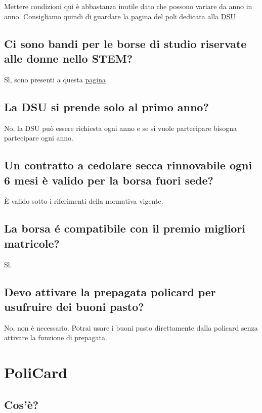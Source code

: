\documentclass[legal]{polinetwork}
\begin{document}
Mettere condizioni qui è abbastanza inutile dato che possono variare da anno in anno. Consigliamo quindi di guardare la pagina del poli dedicata alla \href{https://www.polimi.it/studenti/tasse-borse-e-agevolazioni/diritto-allo-studio}{DSU}

\subsection{Ci sono bandi per le borse di studio riservate alle donne nello STEM?}


Sì, sono presenti a questa \href{https://www.polimi.it/campus-e-servizi/pari-opportunita-e-inclusione/parita-di-genere/girlspolimi}{pagina}

\subsection{La DSU si prende solo al primo anno?}


No, la DSU può essere richiesta ogni anno e se si vuole partecipare bisogna partecipare ogni anno.

\subsection{Un contratto a cedolare secca rinnovabile ogni 6 mesi è valido per la borsa fuori sede?}


È valido sotto i riferimenti della normativa vigente.

\subsection{La borsa é compatibile con il premio migliori matricole?}


Sì.

\subsection{Devo attivare la prepagata policard per usufruire dei buoni pasto?}


No, non è necessario. Potrai usare i buoni pasto direttamente dalla policard senza attivare la funzione di prepagata.

\section{PoliCard}


\subsection{Cos'è?}
\end{document}
